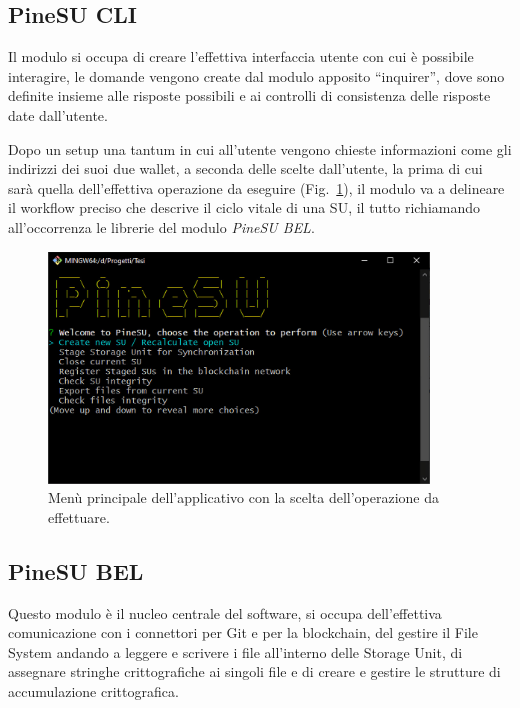 \subsection{PineSU CLI}

Il modulo si occupa di creare l’effettiva interfaccia utente con cui è possibile interagire,
le domande vengono create dal modulo apposito “inquirer”, dove sono definite
insieme alle risposte possibili e ai controlli di consistenza delle risposte date dall’utente.

Dopo un setup una tantum in cui all’utente vengono chieste informazioni come gli indirizzi dei
suoi due wallet, a seconda delle scelte dall’utente, la prima di cui sarà quella dell’effettiva
operazione da eseguire (Fig.~\ref{fi:menu}), il modulo va a delineare il workflow preciso che descrive il ciclo vitale
di una SU, il tutto richiamando all’occorrenza le librerie del modulo \emph{PineSU BEL}. 

\begin{figure}[H]
    \centering
    \includegraphics[width=0.9\textwidth]{Figures/menu}
    \caption{\small{
    Menù principale dell’applicativo con la scelta dell’operazione da effettuare.
    } %
    } %
    \label{fi:menu}
\end{figure}


\subsection{PineSU BEL}

Questo modulo è il nucleo centrale del software, si occupa dell’effettiva comunicazione con i connettori per Git e per la blockchain, del gestire il File System andando a leggere e scrivere i file all’interno delle Storage Unit, di assegnare stringhe crittografiche ai singoli file e di creare e gestire le strutture di accumulazione crittografica.

